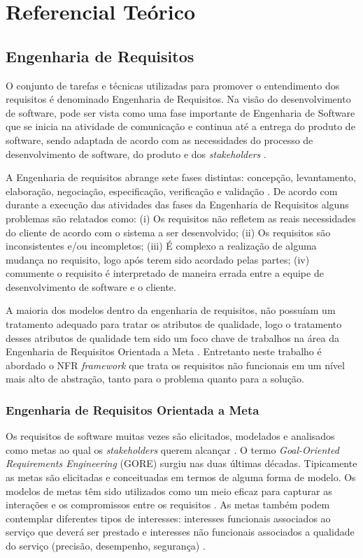 \chapter[Referencial Teórico]{Referencial Teórico}

\section{Engenharia de Requisitos}

O conjunto de tarefas e técnicas utilizadas para promover o entendimento dos requisitos é denominado Engenharia de Requisitos. Na visão do desenvolvimento de software, pode ser vista como uma fase importante de Engenharia de Software que se inicia na atividade de comunicação e continua até a entrega do produto de software, sendo adaptada de acordo com as necessidades do processo de desenvolvimento de software, do produto e dos \textit{stakeholders} \cite{pressman2011engenharia}.

A Engenharia de requisitos abrange sete fases distintas: concepção, levantamento, elaboração, negociação, especificação, verificação e validação \cite{pressman2011engenharia}. De acordo com \cite{kotonya1998requirements} durante a execução das atividades das fases da Engenharia de Requisitos alguns problemas são relatados como: (i) Os requisitos não refletem as reais necessidades do cliente de acordo com o sistema a ser desenvolvido; (ii) Os requisitos são inconsistentes e/ou incompletos; (iii) É complexo a realização de alguma mudança no requisito, logo após terem sido acordado pelas partes; (iv) comumente o requisito é interpretado de maneira errada entre a equipe de desenvolvimento de software e o cliente.  

A maioria dos modelos dentro da engenharia de requisitos, não possuíam um tratamento adequado para tratar os atributos de qualidade, logo o tratamento desses atributos de qualidade tem sido um foco chave de trabalhos na área da Engenharia de Requisitos Orientada a Meta \cite{chung2012non}. Entretanto neste trabalho é abordado o NFR \textit{framework} que trata os requisitos não funcionais em um nível mais alto de abstração, tanto para o problema quanto para a solução. 

\subsection{Engenharia de Requisitos Orientada a Meta}

Os requisitos de software muitas vezes são elicitados, modelados e analisados como metas ao qual os \textit{stakeholders} querem alcançar \cite{van2001goal}. O termo \textit{Goal-Oriented Requirements Engineering} (GORE) surgiu nas duas últimas décadas. Tipicamente as metas são elicitadas e conceituadas  em termos de alguma forma de modelo. Os modelos de metas têm sido utilizados como um meio eficaz para capturar as interações e os compromissos entre os requisitos \cite{letier2002deriving}. As metas também podem contemplar diferentes tipos de interesses: interesses funcionais associados ao serviço que deverá ser prestado e interesses não funcionais associados a qualidade do serviço (precisão, desempenho, segurança) \cite{van2001goal}.
 
